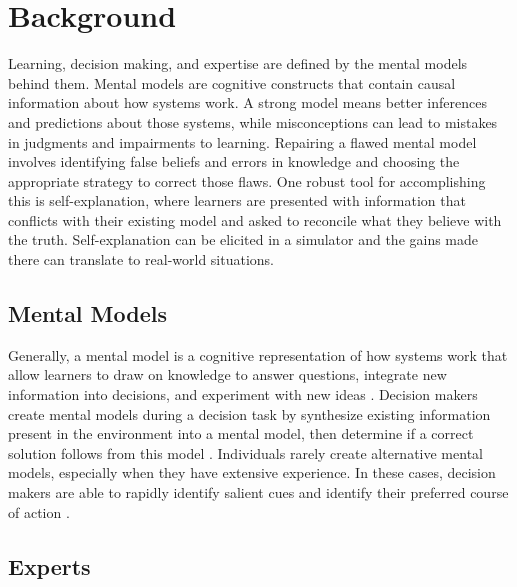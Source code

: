
\chapter{Background}

Learning, decision making, and expertise are defined by the mental models behind them. Mental models are cognitive constructs that contain causal information about how systems work. A strong model means better inferences and predictions about those systems, while misconceptions can lead to mistakes in judgments and impairments to learning. Repairing a flawed mental model involves identifying false beliefs and errors in knowledge and choosing the appropriate strategy to correct those flaws. One robust tool for accomplishing this is self-explanation, where learners are presented with information that conflicts with their existing model and asked to reconcile what they believe with the truth. Self-explanation can be elicited in a simulator and the gains made there can translate to real-world situations.

\section{Mental Models}

Generally, a mental model is a cognitive representation of how systems work \citep{Klein2006} that allow learners to draw on knowledge to answer questions, integrate new information into decisions, and experiment with new ideas \citep{Vosniadou2002}. Decision makers create mental models during a decision task by synthesize existing information present in the environment into a mental model, then determine if a correct solution follows from this model \citep{Newstead2002}. Individuals rarely create alternative mental models, especially when they have extensive experience. In these cases, decision makers are able to rapidly identify salient cues and identify their preferred course of action \citep{Klein1993}.

\section{Experts}
\label{experts}


